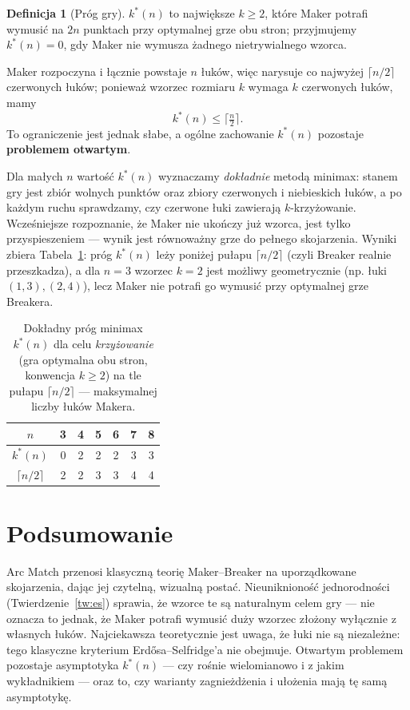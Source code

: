 \documentclass[11pt]{article}
\theoremstyle{definition}
\newtheorem{definicja}{Definicja}[section]
\theoremstyle{plain}
\theoremstyle{remark}
\begin{document}
\begin{definicja}[Próg gry]
$k^*(n)$ to największe $k\ge 2$, które Maker potrafi wymusić na $2n$ punktach przy optymalnej grze obu
stron; przyjmujemy $k^*(n)=0$, gdy Maker nie wymusza żadnego nietrywialnego wzorca.
\end{definicja}

Maker rozpoczyna i łącznie powstaje $n$ łuków, więc narysuje co najwyżej $\lceil n/2\rceil$ czerwonych
łuków; ponieważ wzorzec rozmiaru $k$ wymaga $k$ czerwonych łuków, mamy
\[
k^*(n) \le \Big\lceil \tfrac{n}{2} \Big\rceil .
\]
To ograniczenie jest jednak słabe, a ogólne zachowanie $k^*(n)$ pozostaje \textbf{problemem otwartym}.

Dla małych $n$ wartość
$k^*(n)$ wyznaczamy \emph{dokładnie} metodą minimax: stanem gry jest zbiór wolnych punktów oraz zbiory
czerwonych i niebieskich łuków, a po każdym ruchu sprawdzamy, czy czerwone łuki zawierają
$k$-krzyżowanie. Wcześniejsze rozpoznanie, że Maker nie ukończy już wzorca, jest tylko przyspieszeniem
--- wynik jest równoważny grze do pełnego skojarzenia. Wyniki zbiera Tabela~\ref{tab:kstar}: próg
$k^*(n)$ leży poniżej pułapu $\lceil n/2\rceil$ (czyli Breaker realnie przeszkadza), a dla $n=3$ wzorzec
$k=2$ jest możliwy geometrycznie (np. łuki $(1,3),(2,4)$), lecz Maker nie potrafi go wymusić przy
optymalnej grze Breakera.

\begin{table}[h]
\centering
\begin{tabular}{c|cccccc}
$n$ & 3 & 4 & 5 & 6 & 7 & 8\\\hline
$k^*(n)$ & 0 & 2 & 2 & 2 & 3 & 3\\
$\lceil n/2\rceil$ & 2 & 2 & 3 & 3 & 4 & 4\\
\end{tabular}
\caption{Dokładny próg minimax $k^*(n)$ dla celu \emph{krzyżowanie} (gra optymalna obu stron, konwencja
$k\ge 2$) na tle pułapu $\lceil n/2\rceil$ --- maksymalnej liczby łuków Makera.}
\label{tab:kstar}
\end{table}

\section{Podsumowanie}

Arc Match przenosi klasyczną teorię Maker--Breaker na uporządkowane skojarzenia, dając jej czytelną,
wizualną postać. Nieuniknioność jednorodności (Twierdzenie~\ref{tw:es}) sprawia, że wzorce te są
naturalnym celem gry --- nie oznacza to jednak, że Maker potrafi wymusić duży wzorzec złożony wyłącznie
z własnych łuków. Najciekawsza teoretycznie jest uwaga, że łuki nie są niezależne: tego klasyczne
kryterium Erdősa--Selfridge'a nie obejmuje. Otwartym problemem pozostaje asymptotyka $k^*(n)$ --- czy
rośnie wielomianowo i z jakim wykładnikiem --- oraz to, czy warianty zagnieżdżenia i ułożenia mają tę
samą asymptotykę.
\end{document}
